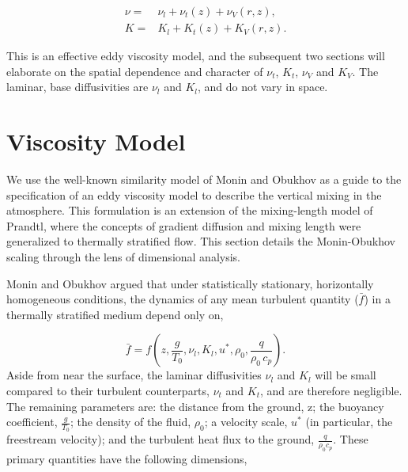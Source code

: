 \begin{eqnarray*}
 \nu =& \nu_{l} + \nu_{t}(z) + \nu_{V}(r,z), \\
 K =& K_{l} + K_{t}(z) + K_{V}(r,z).
\end{eqnarray*}

This is an effective eddy viscosity model\cite{boussinesq1887}, and the
subsequent two sections will elaborate on the spatial dependence and
character of $\nu_t$, $K_t$, $\nu_V$ and $K_V$. The laminar, base
diffusivities are $\nu_l$ and $K_l$, and do not vary in space.  

\section{Viscosity Model}

We use the well-known similarity model of Monin and
Obukhov\cite{monin2007statistical,1990JFM...212..637K} as
a guide to the specification of an eddy viscosity model to describe the
vertical mixing in the atmosphere.
This formulation is an extension of
the mixing-length model of Prandtl, where the concepts of gradient
diffusion and mixing length were generalized to thermally stratified
flow. This section details the Monin-Obukhov scaling through the lens 
of dimensional analysis. 

%
%

Monin and Obukhov argued that under statistically stationary, horizontally
homogeneous conditions, the dynamics of any mean turbulent quantity
($\bar f$) in a thermally stratified medium depend only on,  

\begin{equation}
\bar f = f(z,\frac{g}{T_0},\nu_l,K_l,u^*,\rho_0,\frac{q}{\rho_0 \, c_p}).
\end{equation}
Aside from near the surface, the laminar diffusivities $\nu_l$ 
and $K_l$ will be  
small compared to their turbulent counterparts, $\nu_t$ and $K_t$, and 
are therefore negligible. 
The remaining parameters are: the distance from the ground, z; the
buoyancy coefficient, $\frac{g}{T_0}$; 
the density of the fluid, $\rho_0$; 
a velocity scale, $u^*$ (in particular, the freestream
velocity); and the turbulent heat flux to the ground, $\frac{q}{\rho_0 c_p}$. 
%
% 
These primary quantities have the following dimensions,

